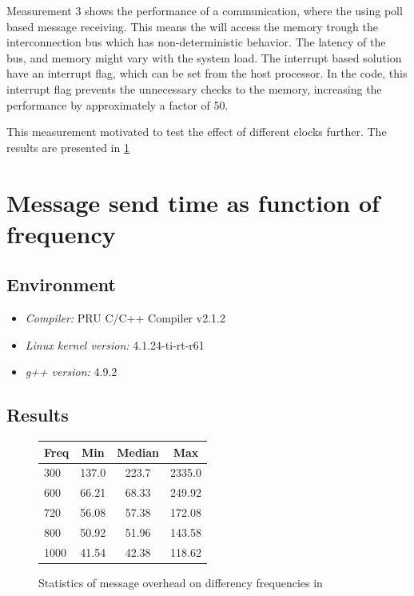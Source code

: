 Measurement 3 shows the performance of a communication, where the \pru{} using poll based message receiving. This means the \pru{} will access the  memory trough the  interconnection bus which has non-deterministic behavior. The latency of the bus, and memory might vary with the system load.
The interrupt based solution have an interrupt flag, which can be set from the host processor. In the code, this interrupt flag prevents the unnecessary checks to the  memory, increasing the performance by approximately a factor of 50.

This measurement motivated to test the effect of different \cpu{} clocks further. The results are presented in \cref{sec:freq}

\section{Message send time as function of \cpu{} frequency}
\label{sec:freq}

\subsection{Environment}
\begin{itemize}
	\item \emph{Compiler:} PRU C/C++ Compiler v2.1.2
	\item \emph{Linux kernel version:} 4.1.24-ti-rt-r61
	\item \emph{g++ version:} 4.9.2
\end{itemize}

\subsection{Results}

\begin{figure}
	\centering
	\caption{Statistics of message overhead on differency \cpu{} frequencies in \si{\mics}}
	\begin{tabular}{l c c c}
		\toprule
		Freq & Min & Median & Max \\
		\midrule
		\si{300}{\MHz}  & 137.0 & 223.7 & 2335.0 \\
		\si{600}{\MHz}  & 66.21 & 68.33 & 249.92 \\
		\si{720}{\MHz}  & 56.08 & 57.38 & 172.08 \\
		\si{800}{\MHz}  & 50.92 & 51.96 & 143.58 \\
		\si{1000}{\MHz} & 41.54 & 42.38 & 118.62 \\
		\bottomrule
	\end{tabular}
\label{fig:rpmsg_freq_stats}
\end{figure}

